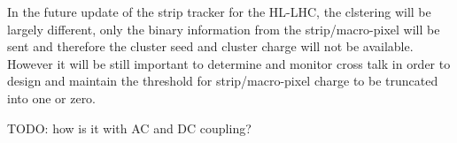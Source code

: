 In the future update of the strip tracker for the HL-LHC, the clstering will be largely different, only the binary information from the strip/macro-pixel will be sent and therefore the cluster seed and cluster charge will not be available. However it will be still important to determine and monitor cross talk in order to design and maintain the threshold for strip/macro-pixel charge to be truncated into one or zero.

TODO: how is it with AC and DC coupling?










